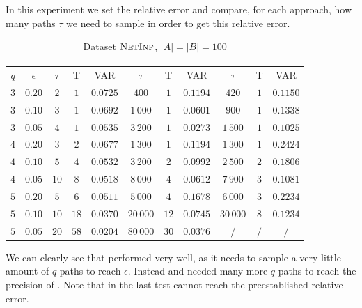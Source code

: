 In this experiment we set the relative error and compare, for each approach, how many paths $\tau$ we need to sample in order to get this relative error.\medskip

\begin{table}[h]
	\centering
	\begin{tabular}{|c|c|c|c|c|c|c|c|c|c|c|}
		\cline{3-11}
		\multicolumn{2}{c|}{} & \multicolumn{3}{c|}{\fcount} & \multicolumn{3}{c|}{\fsamp} & \multicolumn{3}{c|}{\base}\\
		\hline	
		$q$ & $\epsilon$ & $\tau$ & T    & VAR      & $\tau$ & T    & VAR      & $\tau$ & T   & VAR      \\ \hline
		$3$ & $0.20$     & $2$  & $1$  & $0.0725$ & $400$     & $1$  & $0.1194$ & $420$     & $1$ & $0.1150$ \\ \hline
		$3$ & $0.10$     & $3$  & $1$  & $0.0692$ & $1\,000$  & $1$  & $0.0601$ & $900$     & $1$ & $0.1338$ \\ \hline
		$3$ & $0.05$     & $4$  & $1$  & $0.0535$ & $3\,200$  & $1$  & $0.0273$ & $1\,500$  & $1$ & $0.1025$ \\ \hline
		\hline
		$4$ & $0.20$     & $3$  & $2$  & $0.0677$ & $1\,300$  & $1$  & $0.1194$ & $1\,300$  & $1$ & $0.2424$ \\ \hline
		$4$ & $0.10$     & $5$  & $4$  & $0.0532$ & $3\,200$  & $2$  & $0.0992$ & $2\,500$  & $2$ & $0.1806$ \\ \hline
		$4$ & $0.05$     & $10$ & $8$  & $0.0518$ & $8\,000$  & $4$  & $0.0612$ & $7\,900$  & $3$ & $0.1081$ \\ \hline
		\hline
		$5$ & $0.20$     & $5$  & $6$  & $0.0511$ & $5\,000$  & $4$  & $0.1678$ & $6\,000$  & $3$ & $0.2234$ \\ \hline
		$5$ & $0.10$     & $10$ & $18$ & $0.0370$ & $20\,000$ & $12$ & $0.0745$ & $30\,000$ & $8$ & $0.1234$ \\ \hline
		$5$ & $0.05$     & $20$ & $58$ & $0.0204$ & $80\,000$ & $30$ & $0.0376$ & $/$       & $/$ & $/$      \\ \hline
	\end{tabular}
	\caption{Dataset $\textsc{NetInf}$, $|A| = |B| = 100$}
\end{table}
\medskip

We can clearly see that \fcount performed very well, as it needs to sample a very little amount of $q$-paths to reach $\epsilon$.
Instead \fsamp and \base needed many more $q$-paths to reach the precision of \fcount. Note that in the last test \base cannot reach the preestablished relative error.\bigskip

